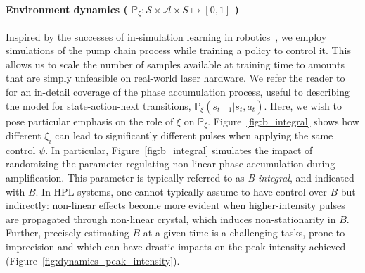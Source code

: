 \paragraph{Environment dynamics ( \( \mathbb P_\xi: \mathcal S \times \mathcal A \times S \mapsto [0,1] \) ) }
Inspired by the successes of in-simulation learning in robotics~\citep{antonova2017reinforcement, akkaya2019solving, tiboni2023domain}, we employ simulations of the pump chain process while training a policy to control it. This allows us to scale the number of samples available at training time to amounts that are simply unfeasible on real-world laser hardware.
We refer the reader to~\cite{paschotta2008field} for an in-detail coverage of the phase accumulation process, useful to describing the model for state-action-next transitions, \( \mathbb P_\xi (s_{t+1}\vert s_t, a_t) \). Here, we wish to pose particular emphasis on the role of \( \xi \) on \( \mathbb P_\xi \). Figure~\ref{fig:b_integral} shows how different \( \xi_i \) can lead to significantly different pulses when applying the same control \( \psi \). In particular, Figure~\ref{fig:b_integral} simulates the impact of randomizing the parameter regulating non-linear phase accumulation during amplification. This parameter is typically referred to as \emph{B-integral}, and indicated with \( B \). 
In HPL systems, one cannot typically assume to have control over \( B \) but indirectly: non-linear effects become more evident when higher-intensity pulses are propagated through non-linear crystal, which induces non-stationarity in \( B \). Further, precisely estimating \( B \) at a given time is a challenging tasks, prone to imprecision and which can have drastic impacts on the peak intensity achieved (Figure~\ref{fig:dynamics_peak_intensity}).


